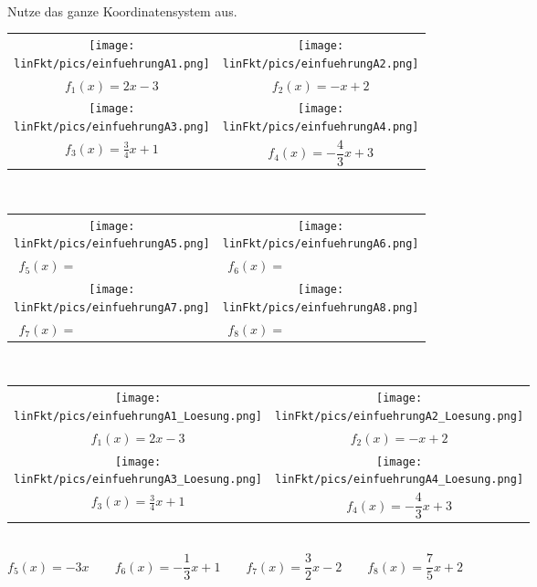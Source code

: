 \begin{Exercise}[title={Zeichne das Schaubild der folgenden Funktionen}, label=lineareFktEinfuehrungA1]\\
	Nutze das ganze Koordinatensystem aus.\\
	\begin{minipage}[t]{\textwidth}
		\begin{tabular}{cc}
			\centering
			\texttt{[image: \\linFkt/pics/einfuehrungA1.png]}&\texttt{[image: \\linFkt/pics/einfuehrungA2.png]}  \\
			$f_1(x)=2x-3$&	$f_2(x)=-x+2$  \\ \addlinespace[20pt]
			\texttt{[image: \\linFkt/pics/einfuehrungA3.png]}&\texttt{[image: \\linFkt/pics/einfuehrungA4.png]}  \\
			$f_3(x)=\frac{3}{4}x+1$&	$f_4(x)=-\dfrac{4}{3}x+3$  \\
		\end{tabular}
\end{minipage}
\end{Exercise}
\newpage
\begin{Exercise}[title={Bestimme die Funktionsgleichung}, label=lineareFktEinfuehrungA2]\\
	\begin{minipage}[t]{\textwidth}
		\begin{tabular}{cc}
			\centering
			\texttt{[image: \\linFkt/pics/einfuehrungA5.png]}&\texttt{[image: \\linFkt/pics/einfuehrungA6.png]}  \\
			$f_5(x)=\qquad\qquad\qquad\qquad\qquad$&	$f_6(x)=\qquad\qquad\qquad\qquad\qquad$  \\ \addlinespace[20pt]
			\texttt{[image: \\linFkt/pics/einfuehrungA7.png]}&\texttt{[image: \\linFkt/pics/einfuehrungA8.png]}  \\
			$f_7(x)=\qquad\qquad\qquad\qquad\qquad$&	$f_8(x)=\qquad\qquad\qquad\qquad\qquad$  \\
		\end{tabular}
\end{minipage}
\end{Exercise}
\newpage
\begin{Answer}[ref=lineareFktEinfuehrungA1]\\
	\begin{minipage}[t]{\textwidth}
		\begin{tabular}{cc}
			\centering
			\texttt{[image: \\linFkt/pics/einfuehrungA1\_Loesung.png]}&\texttt{[image: \\linFkt/pics/einfuehrungA2\_Loesung.png]}  \\
			$f_1(x)=2x-3$&	$f_2(x)=-x+2$  \\ \addlinespace[20pt]
			\texttt{[image: \\linFkt/pics/einfuehrungA3\_Loesung.png]}&\texttt{[image: \\linFkt/pics/einfuehrungA4\_Loesung.png]}  \\
			$f_3(x)=\frac{3}{4}x+1$&	$f_4(x)=-\dfrac{4}{3}x+3$  \\
		\end{tabular}
\end{minipage}
\end{Answer}
\begin{Answer}[ref=lineareFktEinfuehrungA2]\\
	$f_5(x)=-3x\qquad f_6(x)=-\dfrac{1}{3}x+1\qquad f_7(x)=\dfrac{3}{2}x-2\qquad f_8(x)=\dfrac{7}{5}x+2$
\end{Answer}